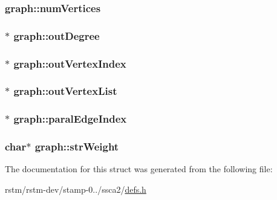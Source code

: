 \hypertarget{structgraph_ab5f6668917726b1556b7306a3933cf2a}{
\subsubsection[{num\-Vertices}]{ graph\-::num\-Vertices}}\label{structgraph_ab5f6668917726b1556b7306a3933cf2a}
\hypertarget{structgraph_a88be5ff5217680aa53c16b6adcded249}{
\subsubsection[{out\-Degree}]{$\ast$ graph\-::out\-Degree}}\label{structgraph_a88be5ff5217680aa53c16b6adcded249}
\hypertarget{structgraph_a3b806cd011f7a2d0a5ca6bd964f80d3d}{
\subsubsection[{out\-Vertex\-Index}]{$\ast$ graph\-::out\-Vertex\-Index}}\label{structgraph_a3b806cd011f7a2d0a5ca6bd964f80d3d}
\hypertarget{structgraph_a3759f331476b226794074ad497e3332b}{
\subsubsection[{out\-Vertex\-List}]{$\ast$ graph\-::out\-Vertex\-List}}\label{structgraph_a3759f331476b226794074ad497e3332b}
\hypertarget{structgraph_abcc42b313a9af28274063f80dfee625e}{
\subsubsection[{paral\-Edge\-Index}]{$\ast$ graph\-::paral\-Edge\-Index}}\label{structgraph_abcc42b313a9af28274063f80dfee625e}
\hypertarget{structgraph_adb85d57b426e86162998d32f6e065a90}{
\subsubsection[{str\-Weight}]{\setlength{\rightskip}{0pt plus 5cm}char$\ast$ graph\-::str\-Weight}}\label{structgraph_adb85d57b426e86162998d32f6e065a90}


The documentation for this struct was generated from the following file\-:\begin{DoxyCompactItemize}
\item 
rstm/rstm-\/dev/stamp-\/0../ssca2/\hyperlink{defs_8h}{defs.\-h}\end{DoxyCompactItemize}
